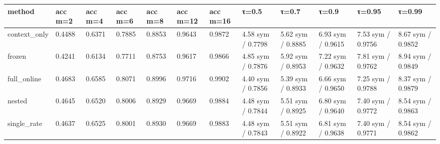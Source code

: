 \begin{tabular}{llllllllllll}
\hline
method & acc m=2 & acc m=4 & acc m=6 & acc m=8 & acc m=12 & acc m=16 & τ=0.5 & τ=0.7 & τ=0.9 & τ=0.95 & τ=0.99 \\
\hline
context\_only & 0.4488 & 0.6371 & 0.7885 & 0.8853 & 0.9643 & 0.9872 & 4.58 sym / 0.7798 & 5.62 sym / 0.8885 & 6.93 sym / 0.9615 & 7.53 sym / 0.9756 & 8.67 sym / 0.9852 \\
frozen & 0.4241 & 0.6134 & 0.7711 & 0.8753 & 0.9617 & 0.9866 & 4.85 sym / 0.7876 & 5.92 sym / 0.8953 & 7.22 sym / 0.9632 & 7.81 sym / 0.9762 & 8.94 sym / 0.9849 \\
full\_online & 0.4683 & 0.6585 & 0.8071 & 0.8996 & 0.9716 & 0.9902 & 4.40 sym / 0.7856 & 5.39 sym / 0.8933 & 6.66 sym / 0.9650 & 7.25 sym / 0.9788 & 8.37 sym / 0.9879 \\
nested & 0.4645 & 0.6520 & 0.8006 & 0.8929 & 0.9669 & 0.9884 & 4.48 sym / 0.7844 & 5.51 sym / 0.8925 & 6.80 sym / 0.9640 & 7.40 sym / 0.9772 & 8.54 sym / 0.9863 \\
single\_rate & 0.4637 & 0.6525 & 0.8001 & 0.8930 & 0.9669 & 0.9883 & 4.48 sym / 0.7843 & 5.51 sym / 0.8922 & 6.81 sym / 0.9638 & 7.40 sym / 0.9771 & 8.54 sym / 0.9862 \\
\hline
\end{tabular}
